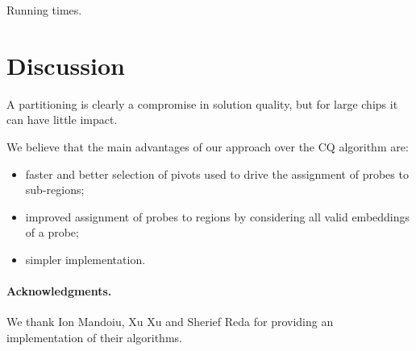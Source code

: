 \documentclass{llncs}
\begin{document}
Running times.

\section{Discussion}
\label{sec:discuss}

A partitioning is clearly a compromise in solution quality, but
for large chips it can have little impact.

We believe that the main advantages of our
approach over the CQ algorithm are:

\begin{itemize}
\item faster and better selection of pivots used to drive
the assignment of probes to sub-regions;
\item improved assignment of probes to regions by considering all valid embeddings
of a probe;
\item simpler implementation.
\end{itemize}

\paragraph{Acknowledgments.}We thank Ion Mandoiu, Xu Xu and Sherief Reda for
providing an implementation of their algorithms.
\end{document}
